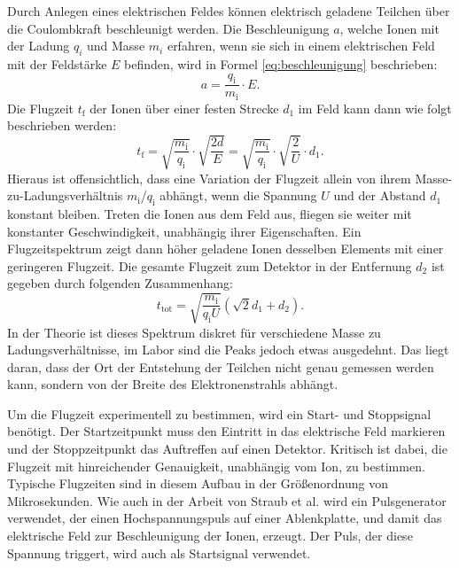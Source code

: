 Durch Anlegen eines elektrischen Feldes können elektrisch geladene Teilchen über die Coulombkraft beschleunigt werden. Die Beschleunigung $a$, welche Ionen mit der Ladung $q_i$ und Masse $m_i$ erfahren, wenn sie sich in einem elektrischen Feld mit der Feldstärke $E$ befinden, wird in Formel \ref{eq:beschleunigung} beschrieben: 
\begin{equation}
    \label{eq:beschleunigung}
    a = \frac{q_{\text{i}}}{m_{\text{i}}} \cdot E.
\end{equation}
Die Flugzeit $t_{\text{f}}$ der Ionen über einer festen Strecke $d_1$ im Feld kann dann wie folgt beschrieben werden:
\begin{equation}
    t_{\text{f}} = \sqrt{\frac{m_{\text{i}}}{q_{\text{i}}}} \cdot \sqrt{\frac{2d}{E}} = \sqrt{\frac{m_{\text{i}}}{q_{\text{i}}}} \cdot \sqrt{\frac{2}{U}} \cdot d_1.
\end{equation}
Hieraus ist offensichtlich, dass eine Variation der Flugzeit allein von ihrem Masse-zu-Ladungsverhältnis ${m_{\text{i}}}$/${q_{\text{i}}}$ abhängt, wenn die Spannung $U$ und der Abstand $d_1$ konstant bleiben. Treten die Ionen aus dem Feld aus, fliegen sie weiter mit konstanter Geschwindigkeit, unabhängig ihrer Eigenschaften. Ein Flugzeitspektrum zeigt dann höher geladene Ionen desselben Elements mit einer geringeren Flugzeit. Die gesamte Flugzeit zum Detektor in der Entfernung $d_2$ ist gegeben durch folgenden Zusammenhang:
\begin{equation}
    t_{\text{tot}} = \sqrt{\frac{m_{\text{i}}}{q_{\text{i}} U}} \left( \sqrt{2} d_1 + d_2 \right).
    \label{eq:time}
\end{equation}
In der Theorie ist dieses Spektrum diskret für verschiedene Masse zu Ladungsverhältnisse, im Labor sind die Peaks jedoch etwas ausgedehnt. Das liegt daran, dass der Ort der Entstehung der Teilchen nicht genau gemessen werden kann, sondern von der Breite des Elektronenstrahls abhängt.

Um die Flugzeit experimentell zu bestimmen, wird ein Start- und Stoppsignal benötigt. Der Startzeitpunkt muss den Eintritt in das elektrische Feld markieren und der Stoppzeitpunkt das Auftreffen auf einen Detektor. Kritisch ist dabei, die Flugzeit mit hinreichender Genauigkeit, unabhängig vom Ion, zu bestimmen. Typische Flugzeiten sind in diesem Aufbau in der Größenordnung von Mikrosekunden. Wie auch in der Arbeit von Straub et al. \cite{Straub} wird ein Pulsgenerator verwendet, der einen Hochspannungspuls auf einer Ablenkplatte, und damit das elektrische Feld zur Beschleunigung der Ionen, erzeugt. Der Puls, der diese Spannung triggert, wird auch als Startsignal verwendet.

